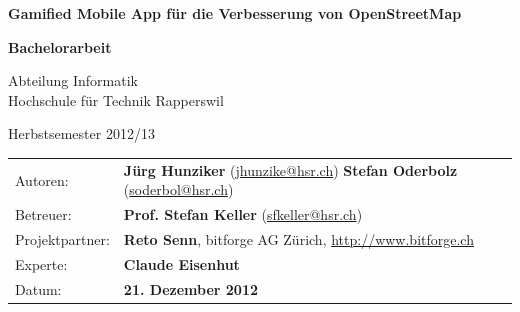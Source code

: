 \begin{titlepage}

\begin{figure}[H]
\hfill
{}
\end{figure}

\vspace{2.2cm}

\begin{center}
{ \Large
	\textbf{Gamified Mobile App für die Verbesserung von OpenStreetMap}
	\vspace{1cm}

	\textbf{Bachelorarbeit}
	\vspace{1cm}

	Abteilung Informatik \\[0.2cm]
	Hochschule für Technik Rapperswil
	\vspace{1cm}

	Herbstsemester 2012/13
}
\end{center}
\vspace{2.3cm}

\begin{tabular}{p{0.19\twocelltabwidth}p{0.81\twocelltabwidth}}
Autoren: & \textbf{Jürg Hunziker} (\url{jhunzike@hsr.ch}) \newline
\textbf{Stefan Oderbolz} (\url{soderbol@hsr.ch}) \\ 
Betreuer: & \textbf{Prof. Stefan Keller} (\url{sfkeller@hsr.ch}) \\ 
Projektpartner: & \textbf{Reto Senn}, bitforge AG Zürich, \url{http://www.bitforge.ch} \\ 
Experte: & \textbf{Claude Eisenhut} \\ 
Datum: & \textbf{21. Dezember 2012} \\ 
\end{tabular}

\end{titlepage}